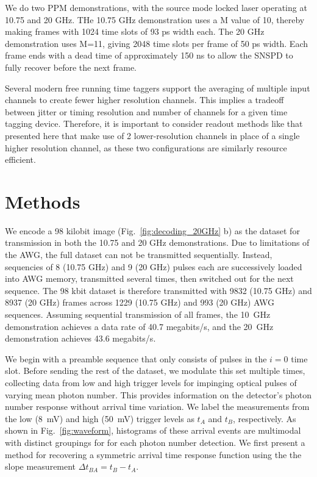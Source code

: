 \documentclass[11pt]{caltech_thesis} %
\begin{document}
We do two PPM demonstrations, with the source mode locked laser operating at 10.75 and 20 GHz. THe 10.75 GHz demonstration uses a M value of 10, thereby making frames with 1024 time slots of 93 ps width each. The 20 GHz demonstration uses M=11, giving 2048 time slots per frame of 50 ps width. Each frame ends with a dead time of approximately 150 ns to allow the SNSPD to fully recover before the next frame.

Several modern free running time taggers support the averaging of multiple input channels to create fewer higher resolution channels. This implies a tradeoff between jitter or timing resolution and number of channels for a given time tagging device. Therefore, it is important to consider readout methods like that presented here that make use of 2 lower-resolution channels in place of a single higher resolution channel, as these two configurations are similarly resource efficient.

\hypertarget{methods}{%
\section{Methods}\label{methods}}

We encode a 98 kilobit image (Fig.~\ref{fig:decoding_20GHz} b) as the dataset for transmission in both the 10.75 and 20 GHz demonstrations. Due to limitations of the AWG, the full dataset can not be transmitted sequentially. Instead, sequencies of 8 (10.75 GHz) and 9 (20 GHz) pulses each are successively loaded into AWG memory, transmitted several times, then switched out for the next sequence. The 98 kbit dataset is therefore transmitted with 9832 (10.75 GHz) and 8937 (20 GHz) frames across 1229 (10.75 GHz) and 993 (20 GHz) AWG sequences. Assuming sequential transmission of all frames, the 10~GHz demonstration achieves a data rate of 40.7 megabits/s, and the 20~GHz demonstration achieves 43.6 megabits/s.

We begin with a preamble sequence that only consists of pulses in the $i = 0$ time slot. Before sending the rest of the dataset, we modulate this set multiple times, collecting data from low and high trigger levels for impinging optical pulses of varying mean photon number. This provides information on the detector's photon number response without arrival time variation. We label the measurements from the low (8~mV) and high (50~mV) trigger levels as $t_A$ and $t_B$, respectively. As shown in Fig.~\ref{fig:waveform}, histograms of these arrival events are multimodal with distinct groupings for for each photon number detection. We first present a method for recovering a symmetric arrival time response function using the the slope measurement $\Delta t_{BA} = t_B - t_A$.
\end{document}
